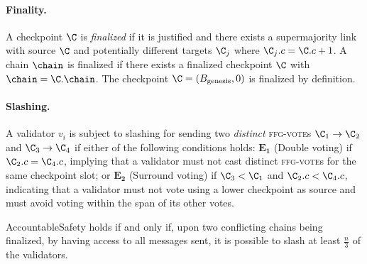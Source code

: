 \paragraph*{Finality.}
A checkpoint \(\C\) is \emph{finalized} if it is justified and there exists a supermajority link with source \(\C\) and potentially different targets \(\C_j\) where \(\C_j.c = \C.c + 1\). A chain \(\chain\) is finalized if there exists a finalized checkpoint \(\C\) with \(\chain = \C.\chain\). The checkpoint \(\C = (B_\text{genesis}, 0)\) is finalized by definition.


\paragraph*{Slashing.}
A validator \(v_i\) is subject to slashing for sending two \emph{distinct} \textsc{ffg-vote}s \(\C_1 \to \C_2\) and \(\C_3 \to \C_4\) if either of the following conditions holds: {\(\mathbf{E_1}\) (Double voting)} if \(\C_2.c = \C_4.c\), implying that a validator must not cast distinct \textsc{ffg-vote}s for the same checkpoint slot; or {\(\mathbf{E_2}\) (Surround voting)} if \(\C_3 < \C_1\)
 and \(\C_2.c < \C_4.c\), indicating that a validator must not vote using a lower checkpoint as source and must avoid voting within the span of its other votes.


 \begin{definition}[AccountableSafety]
  \label{def:acc-safety}
  AccountableSafety holds if and only if, upon two conflicting chains being finalized, 
 {by having access to all messages sent,} it is possible to slash at least $\frac{n}{3}$ of the validators.
\end{definition}